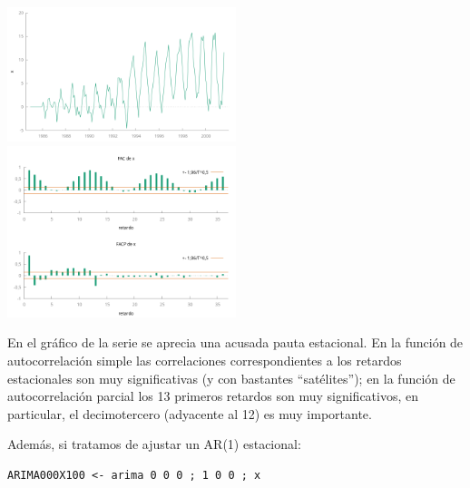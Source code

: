 \documentclass[10pt]{article}
\begin{document}
\begin{center}
\includegraphics[width=0.5\textwidth]{./SegundoEjercicioIdentificacionModeloARIMA/SerieEnNiveles.png}
\includegraphics[width=0.5\textwidth]{./SegundoEjercicioIdentificacionModeloARIMA/x_ACF-PACF.png}
\end{center}

En el gráfico de la serie se aprecia una acusada pauta estacional. En
la función de autocorrelación simple las correlaciones
correspondientes a los retardos estacionales son muy significativas (y
con bastantes ``satélites''); en la función de autocorrelación parcial
los 13 primeros retardos son muy significativos, en particular, el
decimotercero (adyacente al 12) es muy importante.

Además, si tratamos de ajustar un AR(1) estacional:

\begin{verbatim}
ARIMA000X100 <- arima 0 0 0 ; 1 0 0 ; x 
\end{verbatim}
\end{document}
